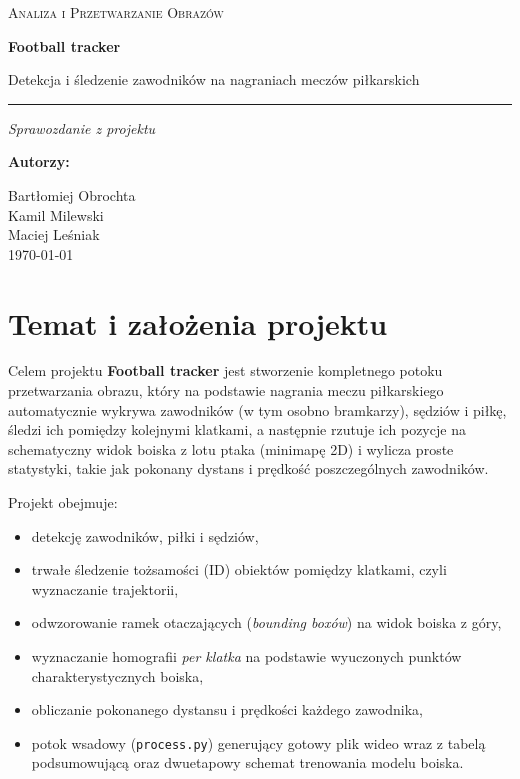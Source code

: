 \documentclass[11pt,a4paper]{article}
\begin{document}
\begin{titlepage}
\centering
\vspace*{2.5cm}

{\Large\scshape Analiza i Przetwarzanie Obrazów}

\vspace{0.5cm}
{\Huge\bfseries Football tracker}

\vspace{0.5cm}
{\large Detekcja i śledzenie zawodników na nagraniach meczów piłkarskich}

\vspace{0.4cm}
\rule{\linewidth}{0.5pt}

\vspace{1.5cm}
{\large\itshape Sprawozdanie z projektu}

\vspace{3cm}
{\large\bfseries Autorzy:}

Bartłomiej Obrochta \\
Kamil Milewski \\
Maciej Leśniak \\

\vfill
{\large \today}

\end{titlepage}

\tableofcontents
\newpage

\section{Temat i założenia projektu}

Celem projektu \textbf{Football tracker} jest stworzenie kompletnego potoku
przetwarzania obrazu, który na podstawie nagrania meczu piłkarskiego
automatycznie wykrywa zawodników (w tym osobno bramkarzy), sędziów i piłkę, śledzi ich pomiędzy
kolejnymi klatkami, a następnie rzutuje ich pozycje na schematyczny widok
boiska z lotu ptaka (minimapę 2D) i wylicza proste statystyki, takie
jak pokonany dystans i prędkość poszczególnych zawodników.

Projekt obejmuje:
\begin{itemize}[nosep]
  \item detekcję zawodników, piłki i sędziów,
  \item trwałe śledzenie tożsamości (ID) obiektów pomiędzy klatkami, czyli wyznaczanie trajektorii,
  \item odwzorowanie ramek otaczających (\emph{bounding boxów}) na widok boiska z góry,
  \item wyznaczanie homografii \emph{per klatka} na podstawie wyuczonych
        punktów charakterystycznych boiska,
  \item obliczanie pokonanego dystansu i prędkości każdego zawodnika,
  \item potok wsadowy (\texttt{process.py}) generujący gotowy plik wideo wraz z
        tabelą podsumowującą oraz dwuetapowy schemat trenowania modelu boiska.
\end{itemize}
\end{document}
